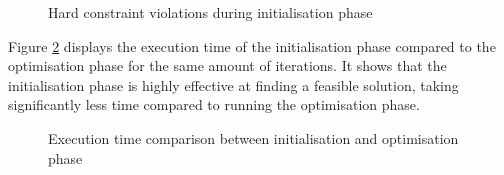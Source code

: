 \begin{figure}[H]
  \centering
  \hfill
  \caption{Hard constraint violations during initialisation phase}
  \label{fig:violations}
\end{figure}

Figure \ref{fig:phase_comparison} displays the execution time of the initialisation phase compared to the optimisation phase for the same amount of iterations. It shows that the initialisation phase is highly effective at finding a feasible solution, taking significantly less time compared to running the optimisation phase.

 
\begin{figure}[H]
  \centering
  \hfill
  \caption{Execution time comparison between initialisation and optimisation phase}
  \label{fig:phase_comparison}
\end{figure}

